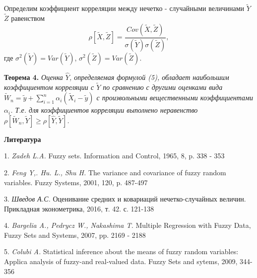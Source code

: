 Определим коэффициент корреляции между нечетко - случайными величинами $\tilde{Y}$ $\tilde{Z}$ равенством
$$
\rho[\tilde{X}, \tilde{Z}] = \frac{Cov(\tilde{X}, \tilde{Z})}{\sigma(\tilde{Y})\sigma(\tilde{Z})},
$$
где $\sigma^2(\tilde{Y}) = Var(\tilde{Y})$, $\sigma^2(\tilde{Z}) = Var(\tilde{Z})$.

\textbf{Теорема 4.} \textit{Оценка $\hat{Y}$, определяемая формулой (5),  обладает наибольшим коэффициентом корреляции с $\tilde{Y}$ по сравнению с другими оценками вида $\tilde{W}_n = \tilde{y} + \sum\limits_{i=1}^n\alpha_i(\tilde{X}_i - \tilde{y})$ с произвольными вещественными коэффициентами $\alpha_i$. Т.е. для коэффициентов  корреляции  выполнено неравенство $\rho[\tilde{W}_n, \tilde{Y}]\geq \rho[\hat{Y},\tilde{Y}] $.}

\smallskip \centerline {\bf Литература} \nopagebreak

1. {\it Zadeh L.A.}  Fuzzy sets. Information and Control, 1965, 8, p. 338 - 353

2.  {\it Feng Y,. Hu. L., Shu H.}  The variance and covariance of fuzzy random variables. Fuzzy Systems,
2001, 120, p. 487-497

3. {\it Шведов А.С.}  Оценивание средних и ковариаций нечетко-случайных величин. Прикладная эконометрика, 2016, т. 42. с. 121-138

4. {\it Bargelia A., Pedrycz W., Nakashima T.}  Multiple Regression with Fuzzy Data, Fuzzy Sets and Systems, 2007, pp. 2169 - 2188

5. {\it Colubi A.} Statistical inference about the means of fuzzy  random variables: Applica analysis of fuzzy-and real-valued data. Fuzzy Sets and sytems, 2009, 344-356

